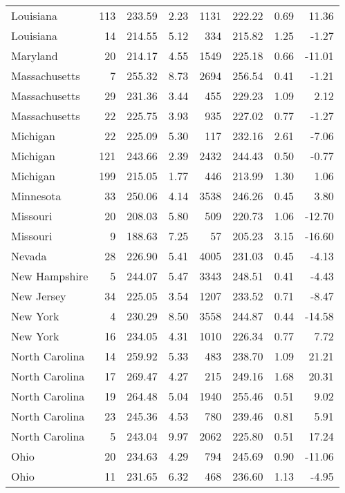 \begin{longtable}{lrrr@{\extracolsep{10pt}}rrrr}
  Louisiana & 113 & 233.59 & 2.23 & 1131 & 222.22 & 0.69 & 11.36 \\ 
  Louisiana &  14 & 214.55 & 5.12 & 334 & 215.82 & 1.25 & -1.27 \\ 
  Maryland &  20 & 214.17 & 4.55 & 1549 & 225.18 & 0.66 & -11.01 \\ 
  Massachusetts &   7 & 255.32 & 8.73 & 2694 & 256.54 & 0.41 & -1.21 \\ 
  Massachusetts &  29 & 231.36 & 3.44 & 455 & 229.23 & 1.09 & 2.12 \\ 
  Massachusetts &  22 & 225.75 & 3.93 & 935 & 227.02 & 0.77 & -1.27 \\ 
  Michigan &  22 & 225.09 & 5.30 & 117 & 232.16 & 2.61 & -7.06 \\ 
  Michigan & 121 & 243.66 & 2.39 & 2432 & 244.43 & 0.50 & -0.77 \\ 
  Michigan & 199 & 215.05 & 1.77 & 446 & 213.99 & 1.30 & 1.06 \\ 
  Minnesota &  33 & 250.06 & 4.14 & 3538 & 246.26 & 0.45 & 3.80 \\ 
  Missouri &  20 & 208.03 & 5.80 & 509 & 220.73 & 1.06 & -12.70 \\ 
  Missouri &   9 & 188.63 & 7.25 &  57 & 205.23 & 3.15 & -16.60 \\ 
  Nevada &  28 & 226.90 & 5.41 & 4005 & 231.03 & 0.45 & -4.13 \\ 
  New Hampshire &   5 & 244.07 & 5.47 & 3343 & 248.51 & 0.41 & -4.43 \\ 
  New Jersey &  34 & 225.05 & 3.54 & 1207 & 233.52 & 0.71 & -8.47 \\ 
  New York &   4 & 230.29 & 8.50 & 3558 & 244.87 & 0.44 & -14.58 \\ 
  New York &  16 & 234.05 & 4.31 & 1010 & 226.34 & 0.77 & 7.72 \\ 
  North Carolina &  14 & 259.92 & 5.33 & 483 & 238.70 & 1.09 & 21.21 \\ 
  North Carolina &  17 & 269.47 & 4.27 & 215 & 249.16 & 1.68 & 20.31 \\ 
  North Carolina &  19 & 264.48 & 5.04 & 1940 & 255.46 & 0.51 & 9.02 \\ 
  North Carolina &  23 & 245.36 & 4.53 & 780 & 239.46 & 0.81 & 5.91 \\ 
  North Carolina &   5 & 243.04 & 9.97 & 2062 & 225.80 & 0.51 & 17.24 \\ 
  Ohio &  20 & 234.63 & 4.29 & 794 & 245.69 & 0.90 & -11.06 \\ 
  Ohio &  11 & 231.65 & 6.32 & 468 & 236.60 & 1.13 & -4.95 \\ 

\end{longtable}
